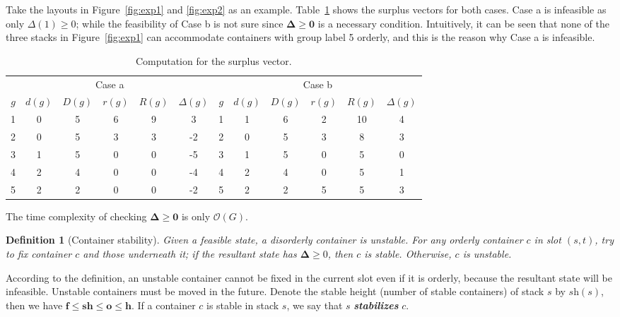 \documentclass[review,3p,times,12pt,number]{elsarticle}\usepackage{amsmath}\usepackage{amssymb}
\newtheorem{definition}{Definition}
\renewcommand{\emph}[1]{\textbf{\textit{#1}}}
\begin{document}
Take the layouts in Figure~\ref{fig:exp1} and \ref{fig:exp2} as an example.
Table~\ref{tab:feasible} shows the surplus vectors for both cases. Case a is infeasible as only $\Delta(1)\ge0$; while the feasibility of Case b is not sure since $\boldsymbol \Delta\ge \boldsymbol {0}$ is a necessary condition. Intuitively, it can be seen that none of the three stacks in Figure~\ref{fig:exp1} can accommodate containers with group label 5 orderly, and this is the reason why Case a is infeasible.

\begin{table}[htbp]
\caption{Computation for the surplus vector.}
\centering

\begin{tabular}{c|c|c|c|c|c||c|c|c|c|c|c}
\hline
\multicolumn{6}{c||}{Case a} & \multicolumn{6}{c}{Case b}\\
\cline{1-6}
\cline{7-12}
$g$ & $d(g)$ & $D(g)$ & $r(g)$ & $R(g)$ & $\Delta(g)$ & $g$ & $d(g)$ & $D(g)$ & $r(g)$ & $R(g)$ & $\Delta(g)$\\
\hline
1   & 0      & 5      & 6      & 9      & 3           & 1   &  1     & 6       & 2      & 10     & 4\\
2   & 0      & 5      & 3      & 3      & -2          & 2   &  0     & 5       & 3      & 8      &  3\\
3   & 1      & 5      & 0      & 0      & -5          & 3   &  1     & 5       & 0      & 5      &  0\\
4   & 2      & 4      & 0      & 0      & -4          & 4   &  2     & 4       & 0      & 5      &  1\\
5   & 2      & 2      & 0      & 0      & -2          & 5   &  2     & 2       & 5      & 5      &  3\\
\hline
\end{tabular}
\label{tab:feasible}
\end{table}

The time complexity of checking $\boldsymbol{\Delta}\ge \boldsymbol{0}$ is only $\mathcal O(G)$.




\begin{definition}[Container stability]
Given a feasible state, a disorderly container is unstable. For any orderly container $c$ in slot $(s,t)$, try to fix container $c$ and those underneath it; if the resultant state has $\boldsymbol{\Delta}\ge 0$, then $c$ is stable. Otherwise, $c$ is unstable.
\end{definition}

According to the definition, an unstable container cannot be fixed in the current slot even if it is orderly, because the resultant state will be infeasible.
Unstable containers must be moved in the future. Denote the stable height (number of stable containers) of stack $s$ by $ \textit {sh}(s)$, then we have $\boldsymbol{f}\le \boldsymbol{sh}\le \boldsymbol{o}\le \boldsymbol{h}$. If a container $c$ is stable in stack $s$, we say that $s$ \emph{stabilizes} $c$.
\end{document}
